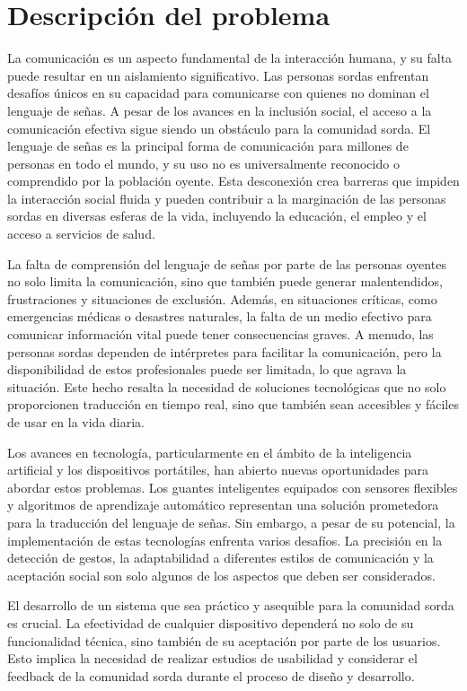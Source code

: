 \section{Descripción del problema}

La comunicación es un aspecto fundamental de la interacción humana, y su falta puede resultar en un aislamiento significativo. Las personas sordas enfrentan desafíos únicos en su capacidad para comunicarse con quienes no dominan el lenguaje de señas. A pesar de los avances en la inclusión social, el acceso a la comunicación efectiva sigue siendo un obstáculo para la comunidad sorda. El lenguaje de señas es la principal forma de comunicación para millones de personas en todo el mundo, y su uso no es universalmente reconocido o comprendido por la población oyente. Esta desconexión crea barreras que impiden la interacción social fluida y pueden contribuir a la marginación de las personas sordas en diversas esferas de la vida, incluyendo la educación, el empleo y el acceso a servicios de salud.

La falta de comprensión del lenguaje de señas por parte de las personas oyentes no solo limita la comunicación, sino que también puede generar malentendidos, frustraciones y situaciones de exclusión. Además, en situaciones críticas, como emergencias médicas o desastres naturales, la falta de un medio efectivo para comunicar información vital puede tener consecuencias graves. A menudo, las personas sordas dependen de intérpretes para facilitar la comunicación, pero la disponibilidad de estos profesionales puede ser limitada, lo que agrava la situación. Este hecho resalta la necesidad de soluciones tecnológicas que no solo proporcionen traducción en tiempo real, sino que también sean accesibles y fáciles de usar en la vida diaria.

Los avances en tecnología, particularmente en el ámbito de la inteligencia artificial y los dispositivos portátiles, han abierto nuevas oportunidades para abordar estos problemas. Los guantes inteligentes equipados con sensores flexibles y algoritmos de aprendizaje automático representan una solución prometedora para la traducción del lenguaje de señas. Sin embargo, a pesar de su potencial, la implementación de estas tecnologías enfrenta varios desafíos. La precisión en la detección de gestos, la adaptabilidad a diferentes estilos de comunicación y la aceptación social son solo algunos de los aspectos que deben ser considerados. 

El desarrollo de un sistema que sea práctico y asequible para la comunidad sorda es crucial. La efectividad de cualquier dispositivo dependerá no solo de su funcionalidad técnica, sino también de su aceptación por parte de los usuarios. Esto implica la necesidad de realizar estudios de usabilidad y considerar el feedback de la comunidad sorda durante el proceso de diseño y desarrollo.

